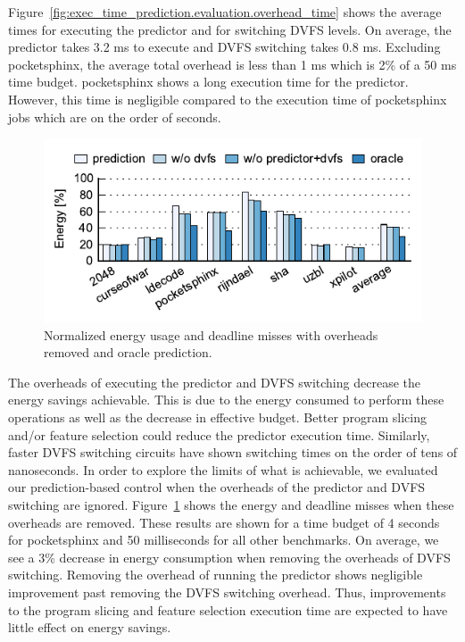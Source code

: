 Figure~\ref{fig:exec_time_prediction.evaluation.overhead_time} shows the
average times for executing the predictor and for switching DVFS levels.  On
average, the predictor takes 3.2 ms to execute and DVFS switching takes 0.8 ms.
Excluding pocketsphinx, the average total overhead is less than 1 ms which is
2\% of a 50 ms time budget.  pocketsphinx shows a long execution time for the
predictor. However, this time is negligible compared to the execution time of
pocketsphinx jobs which are on the order of seconds.

\begin{figure}
  \begin{center}
    \includegraphics{exec_time_prediction/data/overhead_comparison.pdf}
    \caption{Normalized energy usage and deadline misses with overheads removed
    and oracle prediction.}
    \label{fig:exec_time_prediction.evaluation.overhead_comparison}
  \end{center}
\end{figure}

The overheads of executing the predictor and DVFS switching decrease the energy
savings achievable. This is due to the energy consumed to perform these
operations as well as the decrease in effective budget.  Better program slicing
and/or feature selection could reduce the predictor execution time.  Similarly,
faster DVFS switching circuits \cite{booster-hpca12, shortstop-vlsic13,
fgsync-micro14} have shown switching times on the order of tens of nanoseconds.
In order to explore the limits of what is achievable, we evaluated our
prediction-based control when the overheads of the predictor and DVFS switching
are ignored.
Figure~\ref{fig:exec_time_prediction.evaluation.overhead_comparison} shows the
energy and deadline misses when these overheads are removed. These results are
shown for a time budget of 4 seconds for pocketsphinx and 50 milliseconds for all other
benchmarks.  On average, we see a 3\% decrease in energy consumption when
removing the overheads of DVFS switching. Removing the overhead of running the
predictor shows negligible improvement past removing the DVFS switching
overhead. Thus, improvements to the program slicing and feature selection
execution time are expected to have little effect on energy savings.

